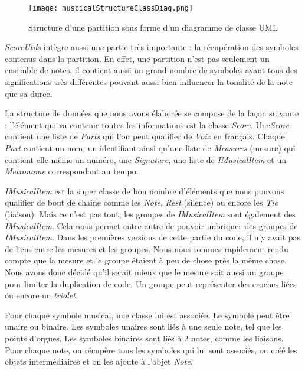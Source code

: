 \begin{figure}[!h]
\centering
\texttt{[image: muscicalStructureClassDiag.png]}\\[1cm]
\caption{Structure d'une partition sous forme d'un diagramme de classe UML}
\end{figure}

\par
\emph{ScoreUtils} intègre aussi une partie très importante : la récupération des symboles contenus dans la partition. En effet, une partition n'est pas seulement un ensemble de notes, il contient aussi un grand nombre de symboles ayant tous des significations très différentes pouvant aussi bien influencer la tonalité de la note que sa durée.


\par
La structure de données que nous avons élaborée se compose de la façon suivante : l'élément qui va contenir toutes les informations est la classe \emph{Score}. Une\emph{Score} contient une liste de \emph{Parts} qui l'on peut qualifier de \emph{Voix} en français. Chaque \emph{Part} contient un nom, un identifiant ainsi qu'une liste de \emph{Measures} (mesure) qui contient elle-même un numéro, une \emph{Signature}, une liste de \emph{IMusicalItem} et un \emph{Metronome} correspondant au tempo.

\par
\emph{IMusicalItem} est la super classe de bon nombre d'éléments que nous pouvons qualifier de bout de chaîne comme les \emph{Note}, \emph{Rest} (silence) ou encore les \emph{Tie} (liaison). Mais ce n'est pas tout, les groupes de \emph{IMusicalItem} sont également des \emph{IMusicalItem}. Cela nous permet entre autre de pouvoir imbriquer des groupes de \emph{IMusicalItem}. Dans les premières versions de cette partie du code, il n'y avait pas de liens entre les mesures et les groupes. Nous nous sommes rapidement rendu compte que la mesure et le groupe étaient à peu de chose près la même chose. Nous avons donc décidé qu'il serait mieux que le mesure soit aussi un groupe pour limiter la duplication de code. Un groupe peut représenter des croches liées ou encore un \emph{triolet}.

\par
Pour chaque symbole musical, une classe lui est associée. Le symbole peut être unaire ou binaire. Les symboles unaires sont liés à une seule note, tel que les points d'orgues. Les symboles binaires sont liés à 2 notes, comme les liaisons. Pour chaque note, on récupère tous les symboles qui lui sont associés, on créé les objets intermédiaires et on les ajoute à l'objet \emph{Note}.


